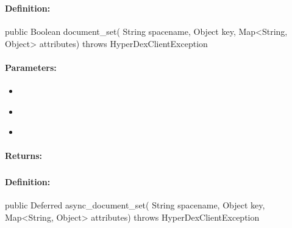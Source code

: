 \pagebreak
\subsubsection{}
\label{api:java:document_set}


\paragraph{Definition:}
\begin{javacode}
public Boolean document_set(
        String spacename,
        Object key,
        Map<String, Object> attributes) throws HyperDexClientException
\end{javacode}

\paragraph{Parameters:}
\begin{itemize}[noitemsep]
\item {}\\

\item {}\\

\item {}\\

\end{itemize}

\paragraph{Returns:}


\pagebreak
\subsubsection{}
\label{api:java:async_document_set}


\paragraph{Definition:}
\begin{javacode}
public Deferred async_document_set(
        String spacename,
        Object key,
        Map<String, Object> attributes) throws HyperDexClientException
\end{javacode}

